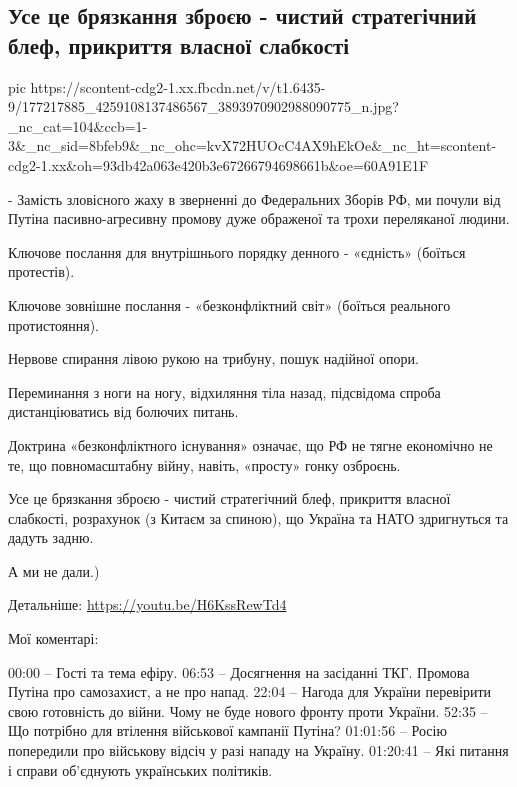  
 
 
 
 
\subsection{Усе це брязкання зброєю - чистий стратегічний блеф, прикриття власної слабкості}
\label{sec:22_04_2021.fb.arestovich_aleksei.1.putin_nazad}

\ifcmt
  pic https://scontent-cdg2-1.xx.fbcdn.net/v/t1.6435-9/177217885_4259108137486567_3893970902988090775_n.jpg?_nc_cat=104&ccb=1-3&_nc_sid=8bfeb9&_nc_ohc=kvX72HUOcC4AX9hEkOe&_nc_ht=scontent-cdg2-1.xx&oh=93db42a063e420b3e67266794698661b&oe=60A91E1F
\fi

- Замість зловісного жаху в зверненні до Федеральних Зборів РФ, ми почули від
Путіна пасивно-агресивну промову дуже ображеної та трохи переляканої людини.

Ключове послання для внутрішнього порядку денного - «єдність» (боїться протестів).

Ключове зовнішне послання - «безконфліктний світ» (боїться реального протистояння). 

Нервове спирання лівою рукою на трибуну, пошук надійної опори.

Переминання з ноги на ногу, відхиляння тіла назад, підсвідома спроба дистанціюватись від болючих питань.

Доктрина «безконфліктного існування» означає, що РФ не тягне економічно не те,
що повномасштабну війну, навіть, «просту» гонку озброєнь.

Усе це брязкання зброєю - чистий стратегічний блеф, прикриття власної
слабкості, розрахунок (з Китаєм за спиною), що Україна та НАТО здригнуться та
дадуть задню.

А ми не дали.)

Детальніше: \url{https://youtu.be/H6KssRewTd4}

Мої коментарі: 

00:00 – Гості та тема ефіру.
06:53 – Досягнення на засіданні ТКГ. Промова Путіна про самозахист, а не про напад. 
22:04 – Нагода для України перевірити свою готовність до війни. Чому не буде нового фронту проти України.
52:35 – Що потрібно для втілення військової кампанії Путіна?
01:01:56 – Росію попередили про військову відсіч у разі нападу на Україну.
01:20:41 – Які питання і справи об’єднують українських політиків.
